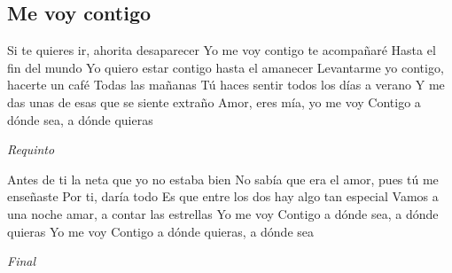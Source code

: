 \subsection{Me voy contigo}
\noindent

\vspace{1cm}

\begin{guitar}
	\begin{multicols}{2}
		\par

		Si te quieres ir, ahorita desaparecer
		Yo me voy contigo te acompañaré
		Hasta el fin del mundo
		Yo quiero estar contigo hasta el amanecer
		Levantarme yo contigo, hacerte un café
		Todas las mañanas
		Tú haces sentir todos los días a verano
		Y me das unas de esas que se siente extraño
		Amor, eres mía, yo me voy
		Contigo a dónde sea, a dónde quieras

		\par
		\textit{Requinto}
		\par

		Antes de ti la neta que yo no estaba bien
		No sabía que era el amor, pues tú me enseñaste
		Por ti, daría todo
		Es que entre los dos hay algo tan especial
		Vamos a una noche amar, a contar las estrellas
		Yo me voy
		Contigo a dónde sea, a dónde quieras
		Yo me voy
		Contigo a dónde quieras, a dónde sea

		\par
		\textit{Final}
	\end{multicols}
\end{guitar}
